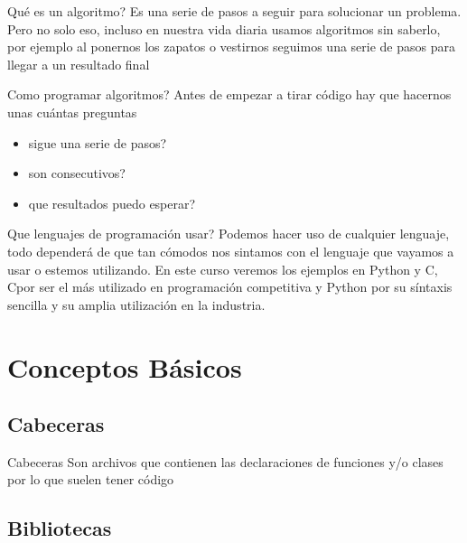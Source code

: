 \documentclass{beamer}
\newcommand{\Rplus}{\protect\hspace{-.1em}\protect\raisebox{.35ex}{\smaller{\smaller\textbf{+}}}}
\newcommand{\Cpp}{\mbox{C\Rplus\Rplus}\hspace{3pt}}
\begin{document}
	\begin{frame}{\textquestiondown Qué es un algoritmo?}
		Es una serie de pasos a seguir para solucionar un problema.\newline
		Pero no solo eso, incluso en nuestra vida diaria usamos algoritmos sin saberlo, por ejemplo al ponernos los zapatos o vestirnos seguimos una serie de pasos para llegar a un resultado final
	\end{frame}
	
	\begin{frame}{\textquestiondown Como programar algoritmos?}
		Antes de empezar a tirar código hay que hacernos unas cu\'antas preguntas
		\begin{itemize}
			\item \textquestiondown sigue una serie de pasos?
			\item \textquestiondown son consecutivos?
			\item \textquestiondown que resultados puedo esperar?
		\end{itemize}
	\end{frame}
	
	\begin{frame}{\textquestiondown Que lenguajes de programaci\'on usar?}
		Podemos hacer uso de cualquier lenguaje, todo depender\'a de que tan c\'omodos nos sintamos con el lenguaje
		que vayamos a usar o estemos utilizando.\newline
		En este curso veremos los ejemplos en Python y \Cpp, \Cpp por ser el m\'as utilizado en programaci\'on competitiva y Python por su s\'intaxis sencilla y su amplia utilizaci\'on en la industria.
	\end{frame}
	
	\section{Conceptos B\'asicos}
	
	\subsection{Cabeceras}
	
	\begin{frame}{Cabeceras}
		Son archivos que contienen las declaraciones de funciones y/o clases por lo que suelen tener c\'odigo
	\end{frame}
	
	\subsection{Bibliotecas}
	
\end{document}
